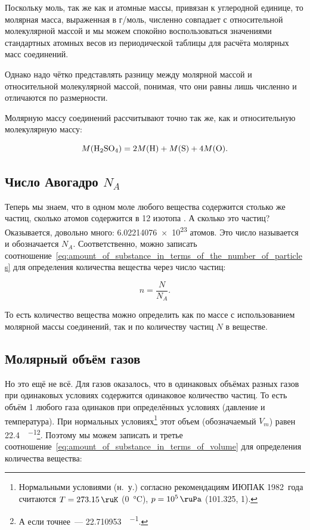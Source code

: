 Поскольку моль, так же как и атомные массы, привязан к углеродной единице, то молярная масса, выраженная в г/моль, численно совпадает с относительной молекулярной массой и мы можем спокойно воспользоваться значениями стандартных атомных весов из периодической таблицы для расчёта молярных масс соединений.

Однако надо чётко представлять разницу между молярной массой и относительной молекулярной массой, понимая, что они равны лишь численно и отличаются по размерности.

Молярную массу соединений рассчитывают точно так же, как и относительную молекулярную массу:

\begin{equation*}
    M(\ce{H2SO4}) = 2M(\ce{H})+M(\ce{S}) + 4M(\ce{O}).
\end{equation*}

\subsection*{Число Авогадро $N_A$}

Теперь мы знаем, что в одном моле любого вещества содержится столько же частиц, сколько атомов содержится в \qty{12}{\ruG} изотопа . А сколько это частиц? Оказывается, довольно много: \num{6,02214076e23} атомов. Это число называется  и обозначается $N_A$. Соответственно, можно записать соотношение~\eqref{eq:amount_of_substance_in_terms_of_the_number_of_particles} для определения количества вещества через число частиц:

\begin{equation}
    \label{eq:amount_of_substance_in_terms_of_the_number_of_particles}
    \boxed{n = \frac{N}{N_A}}.
\end{equation}

То есть количество вещества можно определить как по массе с использованием молярной массы соединений, так и по количеству частиц $N$ в веществе.

\subsection*{Молярный объём газов}

Но это ещё не всё. Для газов оказалось, что в одинаковых объёмах разных газов при одинаковых условиях содержится одинаковое количество частиц. То есть объём \qty{1}{\ruMole} любого газа одинаков при определённых условиях (давление и температура). При нормальных условиях\footnote{Нормальными условиями (н.~у.) согласно рекомендациям ИЮПАК 1982~года считаются $T = \qty{273,15}{\ruK}$ (\qty{0}{\degreeCelsius}), $p = \qty{e5}{\ruPa}$ (\qty{101,325}{\ruKPa}, \qty{1}{\ruAtm}).} этот объем (обозначаемый $V_m$) равен \qty{22,4}{\ruL\per\ruMole}\footnote{А если точнее~--- \qty{22,710953}{\ruL\per\ruMole}.}. Поэтому мы можем записать и третье соотношение~\eqref{eq:amount_of_substance_in_terms_of_volume} для определения количества вещества:

